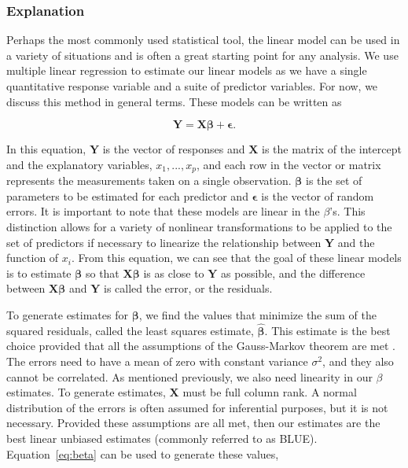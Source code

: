 \documentclass[12pt]{article}\usepackage[]{graphicx}\usepackage[]{color}
\begin{document}
\subsubsection{Explanation}
Perhaps the most commonly used statistical tool, the linear model can be used in a variety of situations and is often a great starting point for any analysis. We use multiple linear regression to estimate our linear models as we have a single quantitative response variable and a suite of predictor variables. For now, we discuss this method in general terms. These models can be written as

\begin{equation} \label{eq:lm}
\boldsymbol{Y}=\boldsymbol{X\beta}+\boldsymbol{\epsilon}.
\end{equation}

In this equation, $\boldsymbol{Y}$ is the vector of responses and $\boldsymbol{X}$ is the matrix of the intercept and the explanatory variables, $x_{1},...,x_{p}$, and each row in the vector or matrix represents the measurements taken on a single observation. $\boldsymbol{\beta}$ is the set of parameters to be estimated for each predictor and $\boldsymbol{\epsilon}$ is the vector of random errors. It is important to note that these models are linear in the $\beta$'s. This distinction allows for a variety of nonlinear transformations to be applied to the set of predictors if necessary to linearize the relationship between \textbf{Y} and the function of $x_{i}$. From this equation, we can see that the goal of these linear models is to estimate $\boldsymbol{\beta}$ so that $\boldsymbol{X\beta}$ is as close to $\boldsymbol{Y}$ as possible, and the difference between $\boldsymbol{X\beta}$ and $\boldsymbol{Y}$ is called the error, or the residuals. 

To generate estimates for $\boldsymbol{\beta}$, we find the values that minimize the sum of the squared residuals, called the least squares estimate, $\boldsymbol{\hat{\beta}}$. This estimate is the best choice provided that  all the assumptions of the Gauss-Markov theorem are met \cite{lm}. The errors need to have a mean of zero with constant variance $\sigma^{2}$, and they also cannot be correlated. As mentioned previously, we also need linearity in our $\beta$ estimates. To generate estimates, $\boldsymbol{X}$ must be full column rank. A normal distribution of the errors is often assumed for inferential purposes, but it is not necessary. Provided these assumptions are all met, then our estimates are the best linear unbiased estimates (commonly referred to as BLUE). Equation~\ref{eq:beta} can be used to generate these values,
\end{document}
